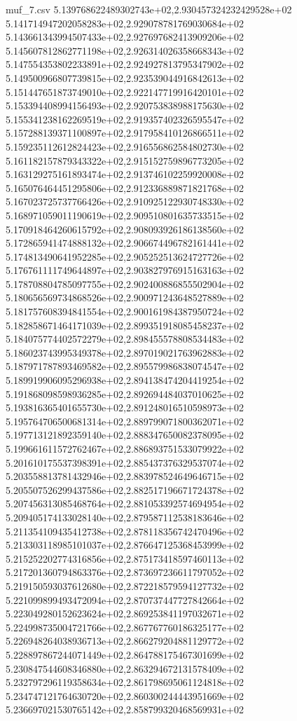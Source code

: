 \begin{filecontents*}{muf_7.csv}
5.139768622489302743e+02,2.930457324232429528e+02
5.141714947202058283e+02,2.929078781769030684e+02
5.143661343994507433e+02,2.927697682413909206e+02
5.145607812862771198e+02,2.926314026358668343e+02
5.147554353802233891e+02,2.924927813795347902e+02
5.149500966807739815e+02,2.923539044916842613e+02
5.151447651873749010e+02,2.922147719916420101e+02
5.153394408994156493e+02,2.920753838988175630e+02
5.155341238162269519e+02,2.919357402326595547e+02
5.157288139371100897e+02,2.917958410126866511e+02
5.159235112612824423e+02,2.916556862584802730e+02
5.161182157879343322e+02,2.915152759896773205e+02
5.163129275161893474e+02,2.913746102259920008e+02
5.165076464451295806e+02,2.912336889871821768e+02
5.167023725737766426e+02,2.910925122930748330e+02
5.168971059011190619e+02,2.909510801635733515e+02
5.170918464260615792e+02,2.908093926186138560e+02
5.172865941474888132e+02,2.906674496782161441e+02
5.174813490641952285e+02,2.905252513624727726e+02
5.176761111749644897e+02,2.903827976915163163e+02
5.178708804785097755e+02,2.902400886855502904e+02
5.180656569734868526e+02,2.900971243648527889e+02
5.181757608394841554e+02,2.900161984387950724e+02
5.182858671464171039e+02,2.899351918085458237e+02
5.184075774402572279e+02,2.898455578808534483e+02
5.186023743995349378e+02,2.897019021763962883e+02
5.187971787893469582e+02,2.895579986838074547e+02
5.189919906095296938e+02,2.894138474204419254e+02
5.191868098598936285e+02,2.892694484037010625e+02
5.193816365401655730e+02,2.891248016510598973e+02
5.195764706500681314e+02,2.889799071800362071e+02
5.197713121892359140e+02,2.888347650082378095e+02
5.199661611572762467e+02,2.886893751533079922e+02
5.201610175537398391e+02,2.885437376329537074e+02
5.203558813781432946e+02,2.883978524649646715e+02
5.205507526299437586e+02,2.882517196671724378e+02
5.207456313085468764e+02,2.881053392574694954e+02
5.209405174133028140e+02,2.879587112538183646e+02
5.211354109435412738e+02,2.878118356742470496e+02
5.213303118985101037e+02,2.876647125368453999e+02
5.215252202774316856e+02,2.875173418597460113e+02
5.217201360794863376e+02,2.873697236611797052e+02
5.219150593037612680e+02,2.872218579594127732e+02
5.221099899493472094e+02,2.870737447727842664e+02
5.223049280152623624e+02,2.869253841197032671e+02
5.224998735004721766e+02,2.867767760186325177e+02
5.226948264038936713e+02,2.866279204881129772e+02
5.228897867244071449e+02,2.864788175467301699e+02
5.230847544608346880e+02,2.863294672131578409e+02
5.232797296119358634e+02,2.861798695061124818e+02
5.234747121764630720e+02,2.860300244443951669e+02
5.236697021530765142e+02,2.858799320468569931e+02

\end{filecontents*}
